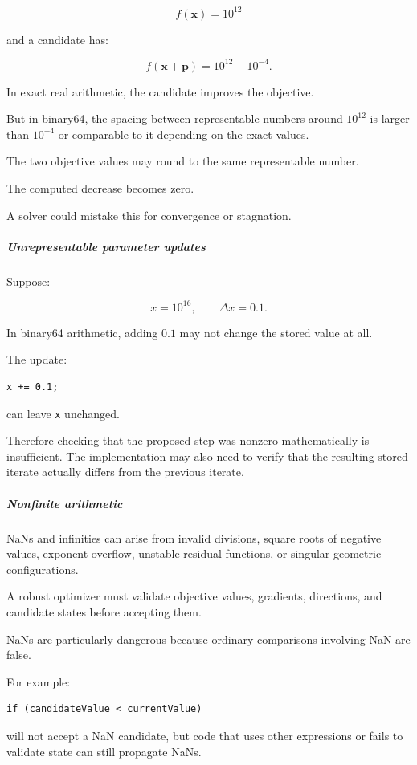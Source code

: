 \[
f(\mathbf x)=10^{12}
\]

and a candidate has:

\[
f(\mathbf x+\mathbf p)=10^{12}-10^{-4}.
\]

In exact real arithmetic, the candidate improves the objective.

But in binary64, the spacing between representable numbers around \(10^{12}\) is larger than \(10^{-4}\) or comparable to it depending on the exact values.

The two objective values may round to the same representable number.

The computed decrease becomes zero.

A solver could mistake this for convergence or stagnation.

\subparagraph{Unrepresentable parameter updates}\label{unrepresentable-parameter-updates}

Suppose:

\[
x=10^{16}, \qquad \Delta x=0.1.
\]

In binary64 arithmetic, adding \(0.1\) may not change the stored value at all.

The update:

\begin{verbatim}
x += 0.1;
\end{verbatim}

can leave \texttt{x} unchanged.

Therefore checking that the proposed step was nonzero mathematically is insufficient. The implementation may also need to verify that the resulting stored iterate actually differs from the previous iterate.

\subparagraph{Nonfinite arithmetic}\label{nonfinite-arithmetic}

NaNs and infinities can arise from invalid divisions, square roots of negative values, exponent overflow, unstable residual functions, or singular geometric configurations.

A robust optimizer must validate objective values, gradients, directions, and candidate states before accepting them.

NaNs are particularly dangerous because ordinary comparisons involving NaN are false.

For example:

\begin{verbatim}
if (candidateValue < currentValue)
\end{verbatim}

will not accept a NaN candidate, but code that uses other expressions or fails to validate state can still propagate NaNs.

